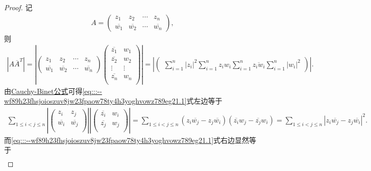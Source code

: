 \documentclass[../../main.tex]{subfiles}%
\begin{document}
\begin{proof}

记
\begin{align*}
A=\begin{pmatrix}
z_1& z_2& \cdots& z_n\\
\overline{w_1}& \overline{w_2}& \cdots& \overline{w_n}
\end{pmatrix},
\end{align*}
则
\begin{align}
\left| A\overline{A}^T \right|
=\left| \begin{pmatrix}
z_1& z_2& \cdots& z_n\\
\overline{w_1}& \overline{w_2}& \cdots& \overline{w_n}
\end{pmatrix} \begin{pmatrix}
\overline{z_1}& w_1\\
\overline{z_2}& w_2\\
\vdots& \vdots\\
\overline{z_n}& w_n\\
\end{pmatrix} \right| 
=\left| \begin{pmatrix}
\sum_{i=1}^n{\left| z_i \right|^2} \sum_{i=1}^n{z_iw_i}
\sum_{i=1}^n{\overline{z_iw_i}} \sum_{i=1}^n{\left| w_i \right|^2}
\end{pmatrix} \right|.\label{eq:::--wf89h23fhsjoioszuv8jw23fpaow78ty4h3yoghvowz789eg21.1}
\end{align}
由\hyperref[Basis-of-Algebra-theorem:Cauchy-Binet公式]{Cauchy-Binet公式}可得\eqref{eq:::--wf89h23fhsjoioszuv8jw23fpaow78ty4h3yoghvowz789eg21.1}式左边等于
\begin{align*}
\sum_{1\leqslant i<j\leqslant n}{\left| \begin{pmatrix}
z_i& z_j\\
\overline{w_i}& \overline{w_j}\\
\end{pmatrix} \right| \left| \begin{pmatrix}
\overline{z_i}& w_i\\
\overline{z_j}& w_j\\
\end{pmatrix} \right|}
=\sum_{1\leqslant i<j\leqslant n}{\left( z_i\overline{w_j}-z_j\overline{w_i} \right) \left( \overline{z_i}w_j-\overline{z_j}w_i \right)}
=\sum_{1\leqslant i<j\leqslant n}{\left| z_i\overline{w_j}-z_j\overline{w_i} \right|^2}.
\end{align*}
而\eqref{eq:::--wf89h23fhsjoioszuv8jw23fpaow78ty4h3yoghvowz789eg21.1}式右边显然等于
\begin{align*}

\end{align*}
\end{proof}
\end{document}
